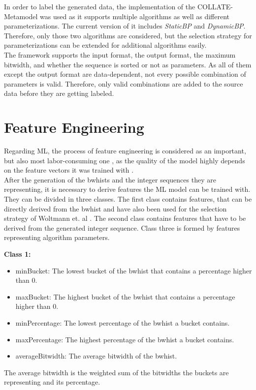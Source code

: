 In order to label the generated data, the implementation of the COLLATE-Metamodel \cite{Hildebrandt2017} was used as it supports multiple algorithms as well as different parameterizations. The current version of it includes \emph{StaticBP} and \emph{DynamicBP}. Therefore, only those two algorithms are considered, but the selection strategy for parameterizations can be extended for additional algorithms easily.\\
The framework supports the input format, the output format, the maximum bitwidth, and whether the sequence is sorted or not as parameters. As all of them except the output format are data-dependent, not every possible combination of parameters is valid. Therefore, only valid combinations are added to the source data before they are getting labeled.

\section{Feature Engineering}
Regarding ML, the process of feature engineering is considered as an important, but also most labor-consuming one \cite{Bengio2013}, as the quality of the model highly depends on the feature vectors it was trained with \cite{Heaton2016}.\\
After the generation of the bwhists and the integer sequences they are representing, it is necessary to derive features the ML model can be trained with. They can be divided in three classes. The first class contains features, that can be directly derived from the bwhist and have also been used for the selection strategy of Woltmann et. al \cite{Woltmann2021}. The second class contains features that have to be derived from the generated integer sequence. Class three is formed by features representing algorithm parameters.

\textbf{Class 1:}
\begin{itemize}[topsep=0pt]
    \itemsep0pt
    \item minBucket: The lowest bucket of the bwhist that contains a percentage higher than 0.
    \item maxBucket: The highest bucket of the bwhist that contains a percentage higher than 0.
    \item minPercentage: The lowest percentage of the bwhist a bucket contains. 
    \item maxPercentage: The highest percentage of the bwhist a bucket contains.
    \item averageBitwidth: The average bitwidth of the bwhist.
\end{itemize}
The average bitwidth is the weighted sum of the bitwidths the buckets are representing and its percentage.

